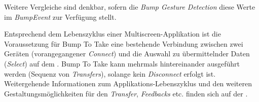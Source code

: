 {Weitere Vergleiche sind denkbar, sofern die \textit{Bump Gesture Detection} diese Werte im \textit{BumpEvent} zur Verfügung stellt.

Entsprechend dem Lebenszyklus einer Multiscreen-Applikation ist die Voraussetzung für Bump To Take eine bestehende Verbindung zwischen zwei Geräten (vorangegangener \textit{Connect}) und die Auswahl zu übermittelnder Daten (\textit{Select}) auf dem \sendev{}. Bump To Take kann mehrmals hintereinander ausgeführt werden (Sequenz von \textit{Transfers}), solange kein \textit{Disconnect} erfolgt ist. \\

Weitergehende Informationen zum Applikations-Lebenszyklus und den weiteren
Gestaltungsmöglichkeiten für den \textit{Transfer}, \textit{Feedbacks} etc. finden sich
auf der \developerpage.
}


\newcommand{\authors}{
Benjamin Grab, Hochschule Mannheim\\
Valentina Burjan, Hochschule Mannheim\\
Dominick Madden, Hochschule Mannheim\\
Horst Schneider, Hochschule Mannheim}

\newcommand{\versionhistory}{10.05.2017}
\newcommand{\dateofcreation}{20.09.2015}




